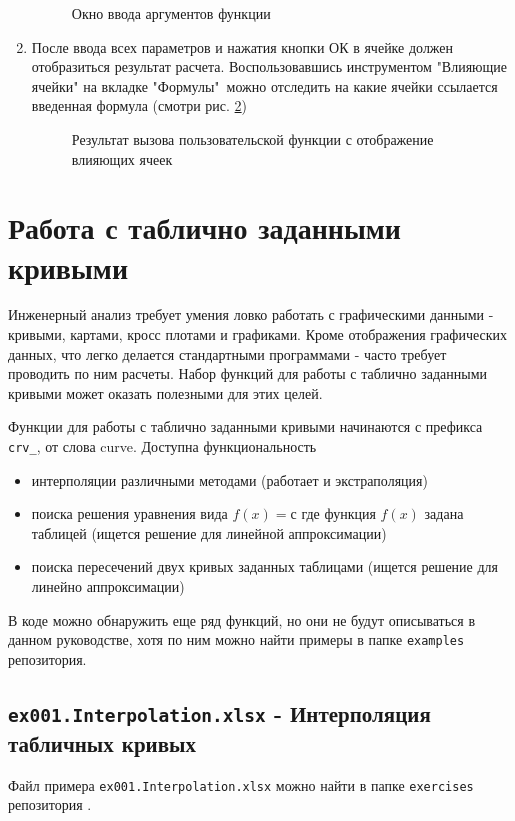 \begin{enumerate}
	\begin{figure}[h!]
		\center{\texttt{[image: Ex10\_3]}}
		\caption{Окно ввода аргументов функции}
		\label{ris:Ex10_3}
	\end{figure}
	
	\item После ввода всех параметров и нажатия кнопки ОК в ячейке должен отобразиться результат расчета. Воспользовавшись инструментом "Влияющие ячейки" на вкладке "Формулы"\ можно отследить на какие ячейки ссылается введенная формула (смотри рис. \ref{ris:Ex10_4})
	\begin{figure}[h!]
		\center{\texttt{[image: Ex10\_4]}}
		\caption{Результат вызова пользовательской функции с отображение влияющих ячеек}
		\label{ris:Ex10_4}
	\end{figure}
\end{enumerate}


\section{Работа с таблично заданными кривыми}
Инженерный анализ требует умения ловко работать с графическими данными - кривыми, картами, кросс плотами и графиками. Кроме отображения графических данных, что легко делается стандартными программами - часто требует проводить по ним расчеты. Набор функций \unf{} для работы с таблично заданными кривыми может оказать полезными для этих целей. 

Функции \unf{} для работы с таблично заданными кривыми начинаются с префикса \texttt{crv_}, от слова curve. Доступна функциональность
\begin{itemize}	
	\item интерполяции различными методами (работает и экстраполяция)
	\item поиска решения уравнения вида $f(x) = с$ где функция $f(x)$ задана таблицей (ищется решение для линейной аппроксимации)
	\item поиска пересечений двух кривых заданных таблицами (ищется решение для линейно аппроксимации)	
\end{itemize}
В коде можно обнаружить еще ряд функций, но они не будут описываться в данном руководстве, хотя по ним можно найти примеры в папке \texttt{examples} репозитория.

\subsection{ \texttt{ex001.Interpolation.xlsx} - Интерполяция табличных кривых}
Файл примера \texttt{ex001.Interpolation.xlsx} можно найти в папке \texttt{exercises} репозитория \unf{}.

